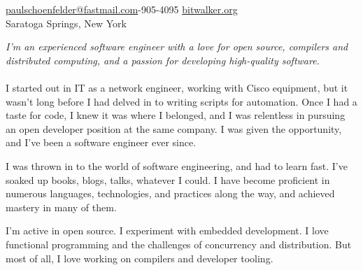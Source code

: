 \documentclass[10pt,a4paper]{article}
\begin{document}
\sloppy  %



\nobreakvspace{0.3em}  %

\noindent\href{mailto:paulschoenfelder@fastmail.com}{paulschoenfelder\mbox{}@\mbox{}fastmail.com}-905-4095\sbull
\href{http://bitwalker.org}{bitwalker.org}
\\
Saratoga Springs, New York

\spacedhrule{0.9em}{-0.4em}  %


\vspace{-1.3em}  %
\begin{multicols}{2}  %
\noindent \emph{I'm an experienced software engineer with a love for open source, compilers and distributed computing, and a passion for developing high-quality software.}
\\
\\
I started out in IT as a network engineer, working with Cisco equipment, but it wasn't long before I had delved in to writing scripts for automation. Once I had a taste for code, I knew it was where I belonged, and I was relentless in pursuing an open developer position at the same company. I was given the opportunity, and I've been a software engineer ever since.

I was thrown in to the world of software engineering, and had to learn fast. I've soaked up books, blogs, talks, whatever I could. I have become proficient in numerous languages, technologies, and practices along the way, and achieved mastery in many of them.

I'm active in open source. I experiment with embedded development. I love functional programming and the challenges of concurrency and distribution. But most of all, I love working on compilers and developer tooling.
\end{multicols}


\spacedhrule{0em}{-0.4em}
\end{document}
